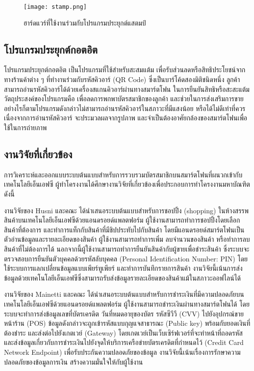 \documentclass[12pt,a4paper,twocolumn]{article}
\begin{document}
\begin{figure}[ht!]
\centering
\texttt{[image: stamp.png]}
\caption{ฮาร์ดแวร์ที่ใช้งานร่วมกับโปรแกรมประยุกต์แสตมป์} \label{fig:stamp}
\label{overflow}
\end{figure}

\subsection{โปรแกรมประยุกต์กอตอิต}
โปรแกรมประยุกต์กอตอิต เป็นโปรแกรมที่ใช้สำหรับสะสมแต้ม เพื่อรับส่วนลดหรือสิทธิประโยชน์จากทางร้านค้าต่าง ๆ ที่ทำงานร่วมกับรหัสคิวอาร์ (QR Code) ซึ่งเป็นบาร์โค้ดสองมิติชนิดหนึ่ง ลูกค้าสามารถอ่านรหัสคิวอาร์ได้ด้วยเครื่องสแกนคิวอาร์ผ่านทางสมาร์ตโฟน ในการยืนยันสิทธิหรือสะสะแต้ม วัตถุประสงค์ของโปรแกรมคือ เพื่อลดการพกพาบัตรสมาชิกของลูกค้า และช่วยในการส่งเสริมการขาย  อย่างไรก็ตามโปรแกรมดังกล่าวไม่สามารถอ่านรหัสคิวอาร์ในสภาวะที่มีแสงน้อย หรือได้ไม่ดีเท่าที่ควร เนื่องจากการอ่านรหัสคิวอาร์ จะประมวลผลจากรูปภาพ และจำเป็นต้องอาศัยกล้องของสมาร์ตโฟนเพื่อใช้ในการถ่ายภาพ

\subsection{งานวิจัยที่เกี่ยวข้อง}
การวิเคราะห์และออกแบบระบบต้นแบบสำหรับการรวบรวมบัตรสมาชิกบนสมาร์ตโฟนที่ผนวกเข้ากับเทคโนโลยีเอ็นเอฟซี ผู้ทำโครงงานได้ศึกษางานวิจัยที่เกี่ยวข้องเพื่อประกอบการทําโครงงานมหาบัณฑิต ดังนี้

งานวิจัยของ Husni และคณะ \cite{itm:shopping} ได้นำเสนอระบบต้นแบบสำหรับการชอปปิ้ง (shopping) ในห้างสรรพสินค้าบนเทคโนโลยีเอ็นเอฟซีด้วยแอนดรอยด์แพลตฟอร์ม ผู้ใช้งานสามารถทำการชอปปิ้งโดยเลือกสินค้าที่ต้องการ และทำการแท็กกับสินค้าที่มีชิปประทับไปกับสินค้า โดยมีแอนดรอยด์สมาร์ตโฟนเป็นตัวอ่านข้อมูลและรายละเอียดของสินค้า ผู้ใช้งานสามารถทำการเพิ่ม ลบจำนวนของสินค้า หรือทำการลบสินค้าที่ไม่ต้องการได้ นอกจากนี้ผู้ใช้งานสามารถทำการยืนยันสินค้ากับผู้ขายเพื่อชำระสินค้า ซึ่งระบบจะตรวจสอบการยืนยันตัวบุคคลด้วยรหัสลับบุคคล (Personal Identification Number: PIN) โดยใช้ระบบการแลกเปลี่ยนข้อมูลแบบเพียร์ทูเพียร์ และทำการบันทึกรายการสินค้า งานวิจัยนี้เน้นการส่งข้อมูลด้วยเทคโนโลยีเอ็นเอฟซีซึ่งสามารถรับส่งข้อมูลรายละเอียดของสินค้าแม้ในสภาวะออฟไลน์ได้

งานวิจัยของ Mainetti และคณะ \cite{itm:IDA-Pay} ได้นำเสนอระบบต้นแบบสำหรับการชำระเงินที่มีความปลอดภัยบนเทคโนโลยีเอ็นเอฟซีด้วยแอนดรอยด์แพลตฟอร์ม ผู้ใช้งานสามารถชำระเงินผ่านทางสมาร์ตโฟนได้ โดยระบบจะทำการส่งข้อมูลเลขที่บัตรเครดิต วันที่หมดอายุของบัตร รหัสซีวีวี (CVV) ไปยังอุปกรณ์ขายหน้าร้าน (POS) ข้อมูลดังกล่าวจะถูกเข้ารหัสแบบกุญแจสาธารณะ (Public key) พร้อมกับยอดเงินที่ต้องชำระ และส่งต่อไปยังเกตเวย์ (Gateway) โดยเกตเวย์เป็นเว็บเซิร์ฟเวอร์ที่จะทำหน้าที่ถอดรหัส และส่งข้อมูลเกี่ยวกับการชำระเงินไปยังจุดให้บริการเครือข่ายบัตรเครดิตที่กำหนดไว้ (Credit Card Network Endpoint) เพื่อรับประกันความปลอดภัยของข้อมูล งานวิจัยนี้เน้นเรื่องการรักษาความปลอดภัยของข้อมูลการเงิน สร้างความมั่นใจให้กับผู้ใช้งาน
\end{document}
